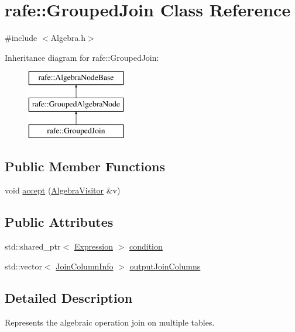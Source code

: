 \hypertarget{classrafe_1_1_grouped_join}{\section{rafe\+:\+:Grouped\+Join Class Reference}
\label{classrafe_1_1_grouped_join}
}


{\ttfamily \#include $<$Algebra.\+h$>$}

Inheritance diagram for rafe\+:\+:Grouped\+Join\+:\begin{figure}[H]
\begin{center}
\leavevmode
\includegraphics[height=3.000000cm]{classrafe_1_1_grouped_join}
\end{center}
\end{figure}
\subsection*{Public Member Functions}
\begin{DoxyCompactItemize}
\item 
void \hyperlink{classrafe_1_1_grouped_join_a36b56821dc719728f1f9294e3f8d8849}{accept} (\hyperlink{classrafe_1_1_algebra_visitor}{Algebra\+Visitor} \&v)
\end{DoxyCompactItemize}
\subsection*{Public Attributes}
\begin{DoxyCompactItemize}
\item 
std\+::shared\+\_\+ptr$<$ \hyperlink{classrafe_1_1_expression}{Expression} $>$ \hyperlink{classrafe_1_1_grouped_join_a9217fbe67d211897dca2d54d0825e86b}{condition}
\item 
std\+::vector$<$ \hyperlink{classrafe_1_1_join_column_info}{Join\+Column\+Info} $>$ \hyperlink{classrafe_1_1_grouped_join_aae2b6f6d25f2b8467dacac459e0a8abb}{output\+Join\+Columns}
\end{DoxyCompactItemize}


\subsection{Detailed Description}
Represents the algebraic operation join on multiple tables. 


